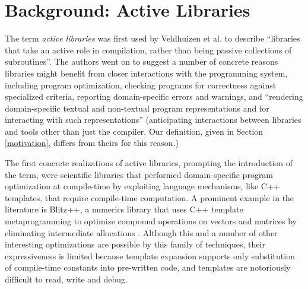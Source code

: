 \newcommand{\nat}{\textbf{nat}}
\newcommand{\natz}{\textbf{z}}
\newcommand{\nats}[1]{\textbf{s}(#1)}
\newcommand{\natrec}[3]{\textbf{natrec}(#1, #2, #3)}
\renewcommand{\ttdefault}{txtt}

\section{Background: Active Libraries}\label{alibs}
The term \emph{active libraries} was first used by Veldhuizen et al. \cite{atthesis, atpaper} to describe ``libraries that take an active role in compilation, rather than being passive collections of subroutines''. The authors went on to suggest a number of concrete reasons libraries might benefit from closer interactions with the programming system, including program optimization, checking programs for correctness against specialized criteria, reporting domain-specific errors and warnings, and ``rendering domain-specific textual and non-textual program representations and for interacting with such representations'' (anticipating interactions between libraries and tools other than just the compiler. Our definition, given in Section \ref{motivation}, differs  from theirs for this reason.) 

The first concrete realizations of active libraries, prompting the introduction of the term, were scientific libraries that performed domain-specific program optimization at compile-time by exploiting language mechanisms, like C++ templates, that require compile-time computation. A prominent example in the literature is Blitz++, a numerics library that uses C++ template metaprogramming to optimize compound operations on vectors and matrices by eliminating intermediate allocations \cite{blitzpp}. Although this and a number of other interesting optimizations\- are possible by this family of techniques, their expressiveness is limited because template expansion supports only substitution of compile-time constants into pre-written code, and templates are notoriously difficult to read, write and debug. %

